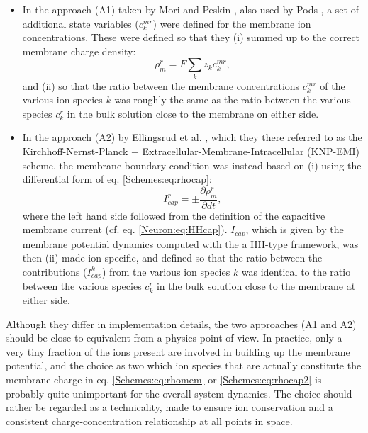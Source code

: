 \begin{itemize}

\item In the approach (A1) taken by Mori and Peskin \citep{Mori2006, Mori2009}, also used by Pods \citep{Pods2017}, a set of additional state variables ($c_k^{mr}$) were defined for the membrane ion concentrations. These were defined so that they (i) summed up to the correct membrane charge density: 
\begin{equation}
\rho_{m}^r = F \sum_k z_k c_k^{mr},
\label{Schemes:eq:rhomem}
\end{equation}
and (ii) so that the ratio between the membrane concentrations $c_k^{mr}$ of the various ion species $k$ was roughly the same as the ratio between the various species $c_k^r$ in the bulk solution close to the membrane on either side. 

\item In the approach (A2) by Ellingsrud et al. \citep{ellingsrud2020}, which they there referred to as the Kirchhoff-Nernst-Planck + Extracellular-Membrane-Intracellular (KNP-EMI) scheme, the membrane boundary condition was instead based on (i) using the differential form of eq. \ref{Schemes:eq:rhocap}:
\begin{equation}
I_{cap}^r = \pm \frac{\partial \rho_{m}^r}{\partial dt}, 
\label{Schemes:eq:rhocap2}
\end{equation}
where the left hand side followed from the definition of the capacitive membrane current (cf. eq. \ref{Neuron:eq:HHcap}). $I_{cap}$, which is given by the membrane potential dynamics computed with the a HH-type framework, was then (ii) made ion specific, and defined so that the ratio between the contributions ($I^k_{cap}$) from the various ion species $k$ was identical to the ratio between the various species $c_k^r$ in the bulk solution close to the membrane at either side.
\end{itemize}

Although they differ in implementation details, the two approaches (A1 and A2) should be close to equivalent from a physics point of view. In practice, only a very tiny fraction of the ions present are involved in building up the membrane potential, and the choice as two which ion species that are actually constitute the membrane charge in eq. \ref{Schemes:eq:rhomem} or \ref{Schemes:eq:rhocap2} is probably quite unimportant for the overall system dynamics. The choice should rather be regarded as a technicality, made to ensure ion conservation and a consistent charge-concentration relationship at all points in space. 

